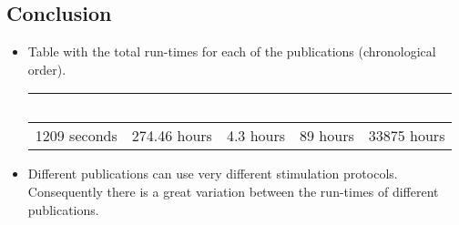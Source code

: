 \documentclass[12pt]{article}
\begin{document}
\subsection*{Conclusion}

\begin{itemize}
\item Table with the total run-times for each of the publications
  (chronological order).

  \begin{tabular}{|c|c|c|c|c|}
    \hline
    ~\cite{De-Schutter-E:1994vn}
    & ~\cite{E:1994hc}
    & ~\cite{schutter94:_simul_purkin}
    & ~\cite{bower09:_compar_evolut_comput_analy_cereb}
    & ~\cite{coop09:_using_purkin}
    \\
    \hline
    1209 seconds
    & 274.46 hours
    & 4.3 hours
    & 89 hours
    & 33875 hours
    \\
    \hline
  \end{tabular}

\item Different publications can use very different stimulation
  protocols.  Consequently there is a great variation between the
  run-times of different publications.
\end{itemize}




\end{document}
